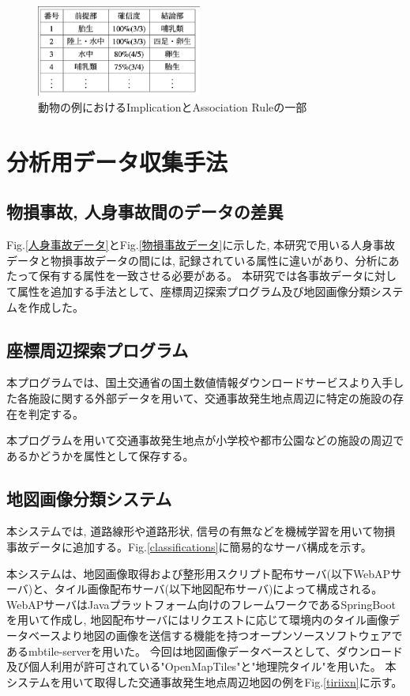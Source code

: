 \documentclass[a4j,8.5pt, twocolumn,fleqn]{jbook}
\begin{document}
\begin{figure}[htb]
    \centering
    \includegraphics[height=30mm]{images/implication.eps}
    \caption{動物の例におけるImplicationとAssociation Ruleの一部}
    \label{implications}
\end{figure}


\section{分析用データ収集手法}
\subsection{物損事故, 人身事故間のデータの差異}
Fig.\ref{人身事故データ}とFig.\ref{物損事故データ}に示した, 本研究で用いる人身事故データと物損事故データの間には, 記録されている属性に違いがあり、分析にあたって保有する属性を一致させる必要がある。
本研究では各事故データに対して属性を追加する手法として、座標周辺探索プログラム及び地図画像分類システムを作成した。

\subsection{座標周辺探索プログラム}
本プログラムでは、国土交通省の国土数値情報ダウンロードサービス\cite{国土数値情報ダウンロードサービス}より入手した各施設に関する外部データを用いて、交通事故発生地点周辺に特定の施設の存在を判定する。

本プログラムを用いて交通事故発生地点が小学校や都市公園などの施設の周辺であるかどうかを属性として保存する。

\subsection{地図画像分類システム}
本システムでは, 道路線形や道路形状, 信号の有無などを機械学習を用いて物損事故データに追加する。Fig.\ref{classifications}に簡易的なサーバ構成を示す。

本システムは、地図画像取得および整形用スクリプト配布サーバ(以下WebAPサーバ)と、タイル画像配布サーバ(以下地図配布サーバ)によって構成される。
WebAPサーバはJavaプラットフォーム向けのフレームワークであるSpringBoot\cite{literature3}を用いて作成し, 地図配布サーバにはリクエストに応じて環境内のタイル画像データベースより地図の画像を送信する機能を持つオープンソースソフトウェアであるmbtile-server\cite{literature4}を用いた。
今回は地図画像データベースとして、ダウンロード及び個人利用が許可されている"OpenMapTiles"と"地理院タイル"を用いた。
本システムを用いて取得した交通事故発生地点周辺地図の例をFig.\ref{tiriixn}に示す。
\end{document}
